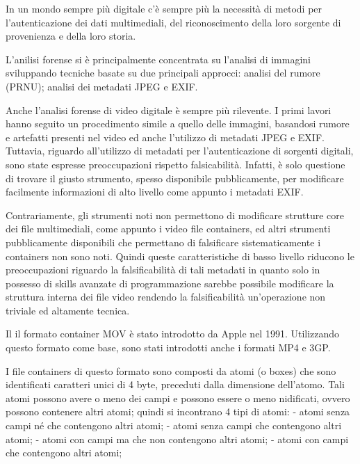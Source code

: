 In un mondo sempre più digitale c'è sempre più la necessità di metodi per l'autenticazione dei dati multimediali, del riconoscimento della loro sorgente di provenienza e della loro storia.

L'anilisi forense si è principalmente concentrata su l'analisi di immagini sviluppando tecniche basate su due principali approcci: analisi del rumore (PRNU); analisi dei metadati JPEG e EXIF.

Anche l'analisi forense di video digitale è sempre più rilevente. I primi lavori hanno seguito un procedimento simile a quello delle immagini, basandosi rumore e artefatti presenti nel video ed anche l'utilizzo di metadati JPEG e EXIF.
Tuttavia, riguardo all'utilizzo di metadati per l'autenticazione di sorgenti digitali, sono state espresse preoccupazioni rispetto falsicabilità. Infatti, è solo questione di trovare il giusto strumento, spesso disponibile pubblicamente, per modificare facilmente informazioni di alto livello come appunto i metadati EXIF.

Contrariamente, gli strumenti noti non permettono di modificare strutture core dei file multimediali, come appunto i video file containers, ed altri strumenti pubblicamente disponibili che permettano di falsificare sistematicamente i containers non sono noti. Quindi queste caratteristiche di basso livello riducono le preoccupazioni riguardo la falsificabilità di tali metadati in quanto solo in possesso di skills avanzate di programmazione sarebbe possibile modificare la struttura interna dei file video rendendo la falsificabilità un'operazione non triviale ed altamente tecnica.

Il il formato container MOV è stato introdotto da Apple nel 1991. Utilizzando questo formato come base, sono stati introdotti anche i formati MP4 e 3GP.

I file containers di questo formato sono composti da atomi (o boxes) che sono identificati caratteri unici di 4 byte, preceduti dalla dimensione dell'atomo. Tali atomi possono avere o meno dei campi e possono essere o meno nidificati, ovvero possono contenere altri atomi; quindi si incontrano 4 tipi di atomi:
- atomi senza campi né che contengono altri atomi;
- atomi senza campi che contengono altri atomi;
- atomi con campi ma che non contengono altri atomi;
- atomi con campi che contengono altri atomi;

